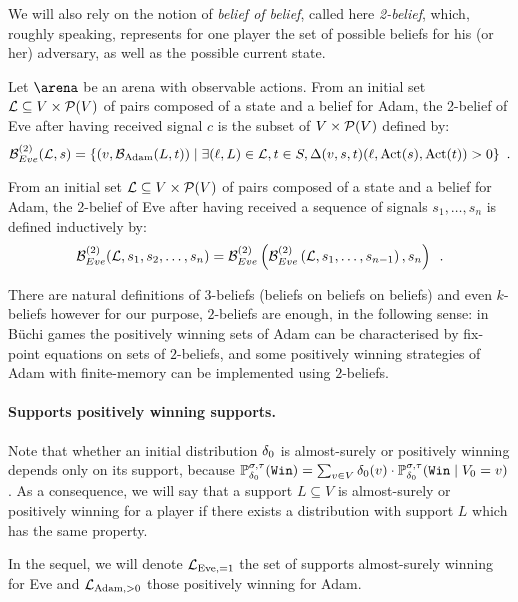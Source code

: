 We will also rely on the notion of \emph{belief of belief}, called
here \emph{2-belief}, which, roughly speaking, represents for one
player the set of possible beliefs for his (or her) adversary,
as well as the possible current state.
\begin{definition}[2-Belief]
{Let $\ar$ be an arena with observable actions.}
  From an initial set ${\mathcal{L}} \subseteq V
  \times \mathcal{P}(V)$ of pairs composed of a state and a belief
  for Adam, the 2-belief of Eve after having received signal $c$ is the subset of 
$V
  \times \mathcal{P}(V)$ defined by:
\[
  \mathcal{B}^{(2)}_{Eve}({\mathcal{L}},s) = \{ (v,\mathcal{B}_{\text{Adam}}(L,t)) \mid
\exists  (\ell,L) \in {\mathcal{L}},  t\in S,
  \Delta(v,s,t)(\ell,\text{Act}(s),\text{Act}(t))
  >0\} \enspace.
  \]

From an initial set ${\mathcal{L}} \subseteq V
\times \mathcal{P}(V)$ of pairs composed of a state and a belief
for Adam, the 2-belief of Eve after having  received a sequence of
signals $s_1,\ldots,s_n$ is defined inductively by:
\[
\mathcal{B}^{(2)}_{Eve}({\mathcal{L}},s_1,s_2,\ldots,s_n) =
\mathcal{B}^{(2)}_{Eve}\left(\mathcal{B}^{(2)}_{Eve}\left({\mathcal{L}},s_1,\ldots,s_{n-1}\right),s_n\right)\enspace.
\]
\end{definition}

There are natural definitions of $3$-beliefs (beliefs on beliefs on beliefs)
and even $k$-beliefs however for our purpose, $2$-beliefs are enough,
in the following sense:
in B\"uchi games the positively winning sets of Adam
can be characterised by fix-point equations on sets of $2$-beliefs,
and some positively winning strategies of Adam with finite-memory
can be implemented using $2$-beliefs.


\paragraph{Supports positively winning supports.}

Note that whether an initial distribution $\delta_0$ is almost-surely or
positively winning depends only on its support, because
$\mathbb{P}^{\sigma,\tau}_{\delta_0}({\tt Win})
=\sum_{v\in V}\delta_0(v)\cdot\mathbb{P}^{\sigma,\tau}_{\delta_0}({\tt Win} \mid V_0= v)$.
As a consequence, we will say that a support
$L\subseteq V$ is almost-surely or positively winning for a
player if there exists a distribution with support $L$ which has the
same property.

In the sequel, we will denote $\mathcal{L}_{\text{Eve},=1}$ the set of supports almost-surely winning for Eve
and  $\mathcal{L}_{\text{Adam},>0}$ those positively winning for Adam.

